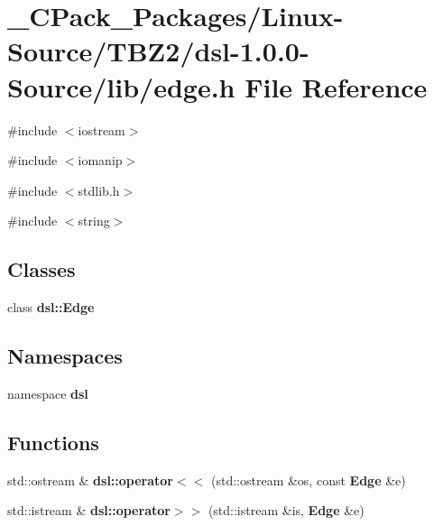 \section{\_\-CPack\_\-Packages/Linux-\/Source/TBZ2/dsl-\/1.0.0-\/Source/lib/edge.h File Reference}
\label{__CPack__Packages_2Linux-Source_2TBZ2_2dsl-1_80_80-Source_2lib_2edge_8h}
{\ttfamily \#include $<$iostream$>$}\par
{\ttfamily \#include $<$iomanip$>$}\par
{\ttfamily \#include $<$stdlib.h$>$}\par
{\ttfamily \#include $<$string$>$}\par
\subsection*{Classes}
\begin{DoxyCompactItemize}
\item 
class {\bf dsl::Edge}
\end{DoxyCompactItemize}
\subsection*{Namespaces}
\begin{DoxyCompactItemize}
\item 
namespace {\bf dsl}
\end{DoxyCompactItemize}
\subsection*{Functions}
\begin{DoxyCompactItemize}
\item 
std::ostream \& {\bf dsl::operator$<$$<$} (std::ostream \&os, const {\bf Edge} \&e)
\item 
std::istream \& {\bf dsl::operator$>$$>$} (std::istream \&is, {\bf Edge} \&e)
\end{DoxyCompactItemize}
